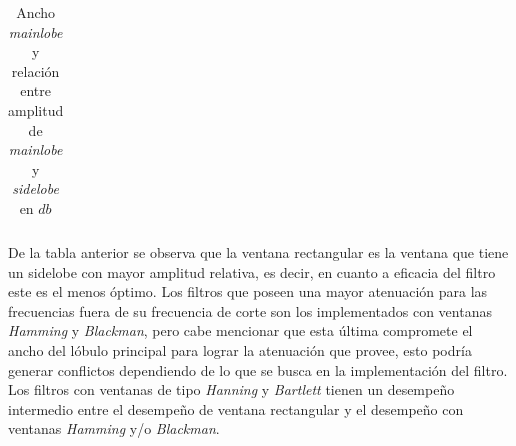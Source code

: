 \begin{enumerate}
\begin{table}[H]
\begin{tabular}{|c|c|c|c|c|c|c|}
        \end{tabular}
        \caption{Ancho \textit{mainlobe} y relación entre amplitud de \textit{mainlobe} y  \textit{sidelobe} en $db$}
        \label{resumen_ventanas}
    \end{table}

     De la tabla anterior se observa que la ventana rectangular es la ventana que tiene un sidelobe con mayor amplitud relativa, es decir, en cuanto a eficacia del filtro este es el menos óptimo.  Los filtros que poseen una mayor atenuación para las frecuencias fuera de su frecuencia de corte son los implementados con ventanas \textit{Hamming} y \textit{Blackman}, pero cabe mencionar que esta última compromete el ancho del lóbulo principal para lograr la atenuación que provee, esto podría generar conflictos dependiendo de lo que se busca en la implementación del filtro.  Los filtros con ventanas de tipo \textit{Hanning} y \textit{Bartlett} tienen un desempeño intermedio entre  el desempeño de ventana rectangular y el desempeño con ventanas \textit{Hamming} y/o \textit{Blackman}.

\end{enumerate}